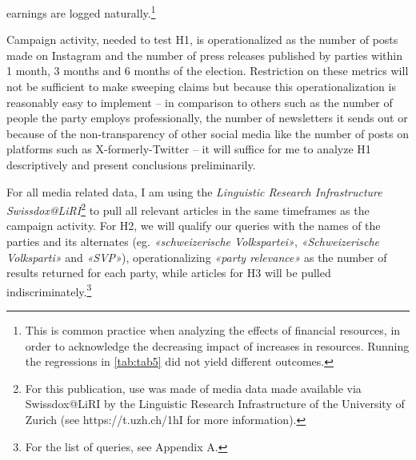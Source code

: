 \documentclass[11pt,a4paper]{article}
\begin{document}
earnings are logged naturally.\footnote{This is common practice when analyzing the effects of financial resources, in order to acknowledge the decreasing impact of increases in resources. Running the regressions in \autoref{tab:tab5} did not yield different outcomes.}

Campaign activity, needed to test H1, is operationalized as the number of posts made on Instagram and the number of press releases published by parties within 1 month, 3 months and 6 months of the election. Restriction on these metrics will not be sufficient to make sweeping claims but because this operationalization is reasonably easy to implement – in comparison to others such as the number of people the party employs professionally, the number of newsletters it sends out or because of the non-transparency of other social media like the number of posts on platforms such as X-formerly-Twitter – it will suffice for me to analyze H1 descriptively and present conclusions preliminarily.

For all media related data, I am using the \textit{Linguistic Research Infrastructure Swissdox@LiRI}\footnote{For this publication, use was made of media data made available via Swissdox@LiRI by the Linguistic Research Infrastructure of the University of Zurich (see https://t.uzh.ch/1hI for more information).} to pull all relevant articles in the same timeframes as the campaign activity. For H2, we will qualify our queries with the names of the parties and its alternates (eg. \textit{«schweizerische Volkspartei»}, \textit{«Schweizerische Volksparti»} and \textit{«SVP»}), operationalizing \textit{«party relevance»} as the number of results returned for each party, while articles for H3 will be pulled indiscriminately.\footnote{For the list of queries, see Appendix A.}
\end{document}
